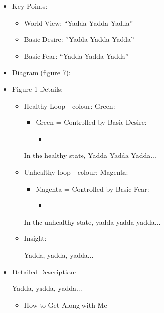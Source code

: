 \documentclass[openleft,oneside,showtrims]{memoir}
\begin{document}
\begin{itemize}
\item Key Points:
\label{sec:orgf268656}
\begin{itemize}
\item World View: ``Yadda Yadda Yadda''
\item Basic Desire: ``Yadda Yadda Yadda''
\item Basic Fear: ``Yadda Yadda Yadda''
\end{itemize}

\item Diagram (figure 7):
\label{sec:orga862532}

\item Figure 1 Details:
\label{sec:org23ab512}

\begin{itemize}
\item Healthy Loop - colour: Green:
\label{sec:org70293dc}

\begin{itemize}
\item Green = Controlled by Basic Desire:
\begin{itemize}
\item 
\end{itemize}
\end{itemize}

In the healthy state, Yadda Yadda Yadda...

\item Unhealthy loop - colour: Magenta:
\label{sec:org35aa937}

\begin{itemize}
\item Magenta = Controlled by Basic Fear:

\begin{itemize}
\item 
\end{itemize}
\end{itemize}

In the unhealthy state, yadda yadda yadda...

\item Insight:
\label{sec:orgcd2d59c}

Yadda, yadda, yadda...
\end{itemize}

\item Detailed Description:
\label{sec:org93f9d80}

Yadda, yadda, yadda...

\begin{itemize}
\item How to Get Along with Me
\label{sec:org359489a}


\end{itemize}
\end{itemize}
\end{document}
